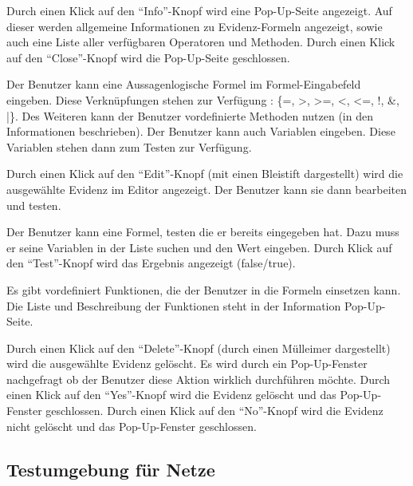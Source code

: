 \documentclass[parskip=full,11pt,twoside]{scrartcl}
\begin{document}

Durch einen Klick auf den \enquote{Info}-Knopf wird eine Pop-Up-Seite angezeigt.
Auf dieser werden allgemeine Informationen zu Evidenz-Formeln angezeigt, sowie auch eine Liste aller verfügbaren Operatoren und Methoden.
Durch einen Klick auf den \enquote{Close}-Knopf wird die Pop-Up-Seite geschlossen.


Der Benutzer kann eine Aussagenlogische Formel im Formel-Eingabefeld eingeben.
Diese Verknüpfungen stehen zur Verfügung : \{=, >, >=, <, <=, !, \&, |\}.
Des Weiteren kann der Benutzer vordefinierte Methoden nutzen (in den Informationen beschrieben).
Der Benutzer kann auch Variablen eingeben. Diese Variablen stehen dann zum Testen zur Verfügung.


Durch einen Klick auf den \enquote{Edit}-Knopf (mit einen Bleistift dargestellt)
wird die ausgewählte Evidenz im Editor angezeigt. Der Benutzer kann sie dann bearbeiten und testen.


Der Benutzer kann eine Formel, testen die er bereits eingegeben hat. Dazu muss er seine Variablen in der Liste suchen und den Wert eingeben. Durch Klick auf den \enquote{Test}-Knopf wird das Ergebnis angezeigt (false/true).


Es gibt vordefiniert Funktionen, die der Benutzer in die Formeln einsetzen kann. Die Liste und Beschreibung der Funktionen steht in der Information Pop-Up-Seite.


Durch einen Klick auf den \enquote{Delete}-Knopf (durch einen Mülleimer dargestellt) wird die ausgewählte Evidenz gelöscht. Es wird durch ein Pop-Up-Fenster nachgefragt ob der Benutzer diese Aktion wirklich durchführen möchte.
Durch einen Klick auf den \enquote{Yes}-Knopf wird die Evidenz gelöscht und das Pop-Up-Fenster geschlossen.
Durch einen Klick auf den \enquote{No}-Knopf wird die Evidenz nicht gelöscht und das Pop-Up-Fenster geschlossen.

\subsection{Testumgebung für Netze}
\end{document}
